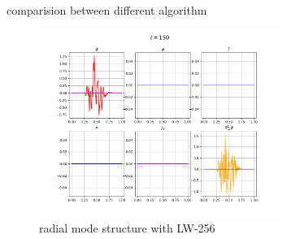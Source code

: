\documentclass{beamer}
\begin{document}
\begin{frame}{comparision between different algorithm}
\begin{figure}[H]
	\centering
	\includegraphics[width=0.7\textwidth]{./images/lw-256-150.png}
	\caption{radial mode structure with LW-256}
\end{figure}
\end{frame}	
\end{document}
